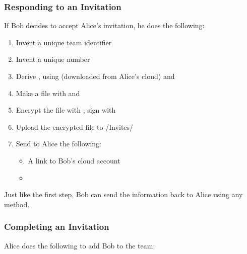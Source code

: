 \documentclass[pldi-cameraready,10pt]{sigplanconf-pldi16}
\begin{document}
\subsubsection{Responding to an Invitation}

If Bob decides to accept Alice's invitation, he does the following:

\begin{enumerate}
\item Invent a unique team identifier 
\item Invent a unique number 
\item Derive , using  (downloaded from Alice's cloud) and 
\item Make a file with  and 
\item Encrypt the file with , sign with 
\item Upload the encrypted file to \slash Invites\slash {}
\item Send to Alice the following:
  \begin{itemize}
  \item A link to Bob's cloud account
  \item {}
  \end{itemize}
\end{enumerate}

Just like the first step, Bob can send the information back to Alice using any method.

\subsubsection{Completing an Invitation}

Alice does the following to add Bob to the team:
\end{document}
